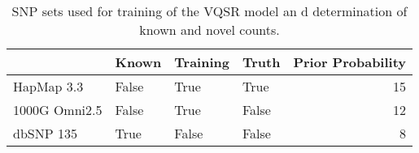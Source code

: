 \begin{table}[h]
\centering
\begin{tabular}{l|lllr}
              & Known & Training & Truth & Prior Probability \\ \hline
HapMap 3.3    & False & True     & True  & 15                \\
1000G Omni2.5 & False & True     & False & 12                \\
dbSNP 135     & True  & False    & False & 8                 \\ \hline                
\end{tabular}
\caption{SNP sets used for training of the \gls{VQSR} model an d determination of known and novel counts.}
\label{tab:vr_sets}
\end{table}
